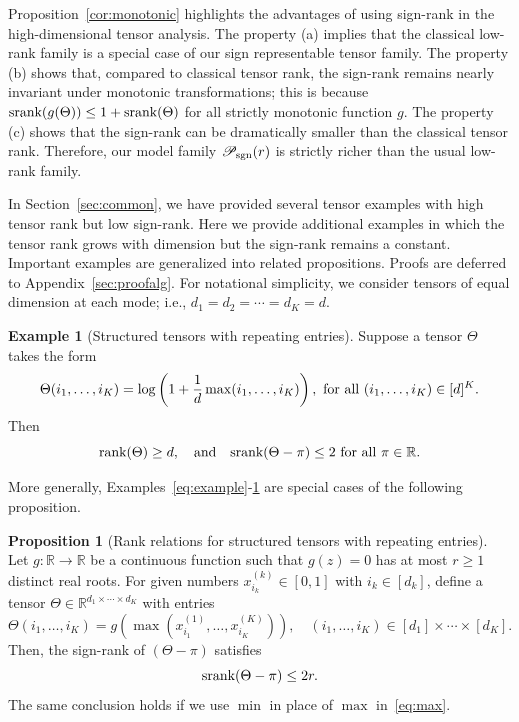 \documentclass[twoside,11pt]{article}
\theoremstyle{definition}
\newtheorem{prop}{Proposition}
\newtheorem{example}{Example}
\def\srank{\textup{srank}}
\def\rank{\textup{rank}}
\def\caliP{\mathscr{P}_{\textup{sgn}}}
\begin{document}
Proposition~\ref{cor:monotonic} highlights the advantages of using sign-rank in the high-dimensional tensor analysis. The property (a) implies that the classical low-rank family is a special case of our sign representable tensor family.  The property (b) shows that, compared to classical tensor rank, the sign-rank remains nearly invariant under monotonic transformations; this is because $\srank(g(\Theta))\leq 1+\srank(\Theta)$ for all strictly monotonic function $g$. The property (c) shows that the sign-rank can be dramatically smaller than the classical tensor rank. Therefore, our model family $\caliP(r)$ is strictly richer than the usual low-rank family. 


In Section~\ref{sec:common}, we have provided several tensor examples with high tensor rank but low sign-rank. Here we provide additional examples in which the tensor rank grows with dimension but the sign-rank remains a constant. Important examples are generalized into related propositions. Proofs are deferred to Appendix~\ref{sec:proofalg}. For notational simplicity, we consider tensors of equal dimension at each mode; i.e., $d_1=d_2=\cdots=d_K=d$. 


\begin{example}[Structured tensors with repeating entries]\label{example:max} Suppose a tensor $\Theta$ takes the form 
\[
\Theta(i_1,\ldots,i_K)=\log\left(1+{1\over d}\max(i_1,\ldots,i_K)\right), \ \text{for all }(i_1,\ldots,i_K)\in[d]^K.
\]
 Then 
 \[
 \rank(\Theta)\geq d, \quad \text{and}\quad \srank(\Theta-\pi)\leq 2\ \text{for all }\pi\in\mathbb{R}. 
 \]
\end{example}
More generally, Examples~\ref{eq:example}-\ref{example:max} are special cases of the following proposition. 

\begin{prop}[Rank relations for structured tensors with repeating entries]\label{prop:repeat}Let $g\colon \mathbb{R}\to \mathbb{R}$ be a continuous function such that $g(z)=0$ has at most $r\geq 1$ distinct real roots. For given numbers $x^{(k)}_{i_k}\in[0,1]$ with $i_k\in[d_k]$, define a tensor $\Theta\in\mathbb{R}^{d_1\times\cdots \times d_K}$ with entries 
\begin{equation}\label{eq:max}
\Theta(i_1,\ldots,i_K)=g(\max(x^{(1)}_{i_1},\ldots,x^{(K)}_{i_K})),\quad (i_1,\ldots,i_K)\in[d_1]\times\cdots\times[d_K].
\end{equation}
Then, the sign-rank of $(\Theta-\pi)$ satisfies
\[
\srank(\Theta-\pi)\leq 2r.
\]
The same conclusion holds if we use $\min$ in place of $\max$ in~\eqref{eq:max}. 
\end{prop}
\end{document}
